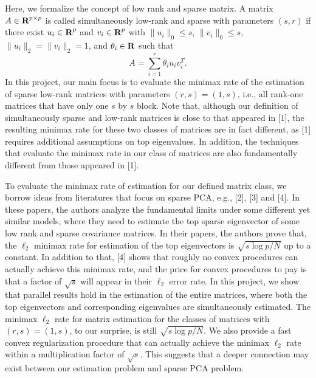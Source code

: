 \documentclass[landscape,a0b,final]{a0poster}
\newenvironment{poster}{
  \begin{center}
  \begin{minipage}[c]{0.98\textwidth}
}{
  \end{minipage}
  \end{center}
}
\newenvironment{pcolumn}[1]{
  \begin{minipage}{#1\textwidth}
  \begin{center}
}{
  \end{center}
  \end{minipage}
}
\newcommand{\pbox}[4]{
\psshadowbox[#3]{
\begin{minipage}[t][#2][t]{#1}
#4
\end{minipage}
}}
\begin{document}
\begin{poster}
\begin{center}
\begin{pcolumn}{0.30}
{\vspace{0.5cm}


\vspace{1cm}
\begin{center}\pbox{0.8\textwidth}{}{linewidth=2mm,framearc=0.1,linecolor=lightred,
fillstyle=gradient,gradangle=0,gradbegin=white,gradend=whitered,gradmidpoint=1.0,framesep=1em}
{\begin{center}Background and Related Work\end{center}}\end{center}
\vspace{0.5cm}
Here, we formalize the concept of low rank and sparse matrix. 
A matrix $A \in \textbf{R}^{p\times p}$ is called simultaneously low-rank and sparse with parameters $(s, r)$ 
if there exist $u_i \in \textbf{R}^p$ and $v_i\in \textbf{R}^p$ with $\|u_i\|_0 \leq s$, $\|v_i\|_0 \leq s$, $\|u_i\|_2 = \|v_i\|_2 =1$,
and $\theta_i \in \textbf{R}$ such that 
\begin{equation*}
A = \sum_{i=1}^r \theta_i u_i v_i^T.
\end{equation*}
In this project, our main focus is to evaluate the minimax rate of the estimation of 
sparse low-rank matrices with parameters $(r, s) = (1, s)$, i.e., all rank-one 
matrices that have only one $s$ by $s$ block. 
Note that, although our definition of simultaneously sparse and low-rank matrices 
is close to that appeared in [1], the resulting minimax rate for these two classes 
of matrices are in fact different, as [1] requires additional assumptions on 
top eigenvalues. In addition, the techniques that evaluate the 
minimax rate in our class of matrices are also fundamentally different 
from those appeared in [1]. 

To evaluate the minimax rate of estimation for our defined matrix class, we 
borrow ideas from literatures that focus on sparse PCA, e.g., [2], [3] and [4]. In 
these papers, the authors analyze the fundamental limits under some different yet 
similar models, where they need to estimate the top sparse eigenvector of some 
low rank and sparse covariance matrices.  
In their papers, the authors prove that, the $\ell_2$ minimax rate for estimation of 
the top eigenvectors is $\sqrt{s\log p/N}$ up to a constant. In addition to that, [4] shows
that roughly no convex procedures can actually achieve this minimax rate, and the price 
for convex procedures to pay is that a factor of $\sqrt{s}$ will appear in their $\ell_2$ error rate. 
In this project, we show that parallel results hold in the estimation of the entire matrices,
where both the top eigenvectors and corresponding eigenvalues are simultaneously estimated. 
The minimax $\ell_2$ rate for matrix estimation for the classes of matrices with $(r, s) = (1, s)$, 
to our surprise, is still $\sqrt{s\log p/N}$. 
We also provide a fast convex regularization procedure that can actually achieve the 
minimax $\ell_2$ rate within a multiplication factor of $\sqrt{s}$. This suggests that 
a deeper connection may exist between our estimation problem and sparse PCA problem.


}
\end{pcolumn}
\end{center}
\end{poster}
\end{document}

